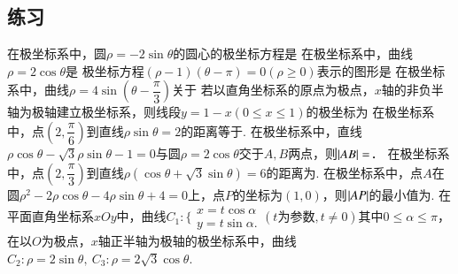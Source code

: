 \documentclass{BHCexam}
\begin{document}
\subsection{练习}
\begin{questions}

\qs 在极坐标系中，圆$ \rho=-2\sin \theta $的圆心的极坐标方程是\xx
{}
\qs 在极坐标系中，曲线$\rho=2\cos\theta $是\xx
{}
\qs 极坐标方程$ \left(\rho-1 \right)\left(\theta-\pi\right)=0\left(\rho\ge0\right) $表示的图形是\xx
{}
\qs 在极坐标系中，曲线$ \rho=4\sin\left(\theta-\dfrac{\pi}{3}\right) $关于\xx
{}
\qs 若以直角坐标系的原点为极点，$x$轴的非负半轴为极轴建立极坐标系，则线段$ y=1-x (0\le x\le 1)$的极坐标为\xx
{}
\qs 在极坐标系中，点$ \left(2,\dfrac{\pi}{6}\right) $到直线$ \rho\sin\theta =2$的距离等于\tk.
\qs 在极坐标系中，直线$ \rho\cos\theta-\sqrt{3}\rho\sin\theta-1=0 $与圆$ \rho=2\cos\theta $交于$ A,B $两点，则$ \left|AB\right|= $\tk．
\qs 在极坐标系中，点$ \left(2,\dfrac{\pi}{3}\right) $到直线$ \rho\left(\cos\theta+\sqrt{3}\sin\theta\right)=6 $的距离为\tk.
\qs 在极坐标系中，点$ A $在圆$ \rho^2-2\rho\cos\theta -4\rho\sin\theta+4=0$上，点$ P $的坐标为$ (1,0) $，则$ \left|AP\right| $的最小值为\tk.
\qs 在平面直角坐标系$xOy$中，曲线$ C_1:\Bigg\{\begin{aligned}
x=t\cos \alpha\\
y=t\sin\alpha.
\end{aligned}(t\text{为参数},t\ne0) $其中$ 0\le\alpha\le\pi $，在以$ O $为极点，$x$轴正半轴为极轴的极坐标系中，曲线$ C_2:\rho=2\sin\theta ,~C_3:\rho=2\sqrt{3}\cos\theta$.


\end{questions}
\end{document}
